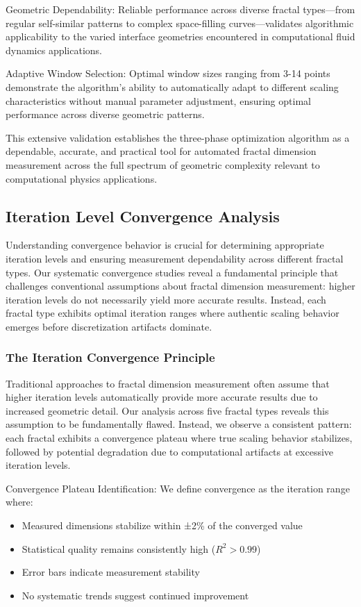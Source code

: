 \documentclass[preprint,12pt]{elsarticle}
\def\textbf#1{#1}%
\begin{document}
\textbf{Geometric Dependability}: Reliable performance across diverse fractal types—from regular self-similar patterns to complex space-filling curves—validates algorithmic applicability to the varied interface geometries encountered in computational fluid dynamics applications.

\textbf{Adaptive Window Selection}: Optimal window sizes ranging from 3-14 points demonstrate the algorithm's ability to automatically adapt to different scaling characteristics without manual parameter adjustment, ensuring optimal performance across diverse geometric patterns.

This extensive validation establishes the three-phase optimization algorithm as a dependable, accurate, and practical tool for automated fractal dimension measurement across the full spectrum of geometric complexity relevant to computational physics applications.

\subsection{Iteration Level Convergence Analysis}
\label{subsec:convergence_analysis}

Understanding convergence behavior is crucial for determining appropriate iteration levels and ensuring measurement dependability across different fractal types. Our systematic convergence studies reveal a fundamental principle that challenges conventional assumptions about fractal dimension measurement: \textbf{higher iteration levels do not necessarily yield more accurate results}. Instead, each fractal type exhibits optimal iteration ranges where authentic scaling behavior emerges before discretization artifacts dominate.

\subsubsection{The Iteration Convergence Principle}

Traditional approaches to fractal dimension measurement often assume that higher iteration levels automatically provide more accurate results due to increased geometric detail. Our analysis across five fractal types reveals this assumption to be fundamentally flawed. Instead, we observe a consistent pattern: each fractal exhibits a convergence plateau where true scaling behavior stabilizes, followed by potential degradation due to computational artifacts at excessive iteration levels.

\textbf{Convergence Plateau Identification}: We define convergence as the iteration range where:
\begin{itemize}
\item Measured dimensions stabilize within ±2\% of the converged value
\item Statistical quality remains consistently high ($R^2 > 0.99$)
\item Error bars indicate measurement stability
\item No systematic trends suggest continued improvement
\end{itemize}
\end{document}
